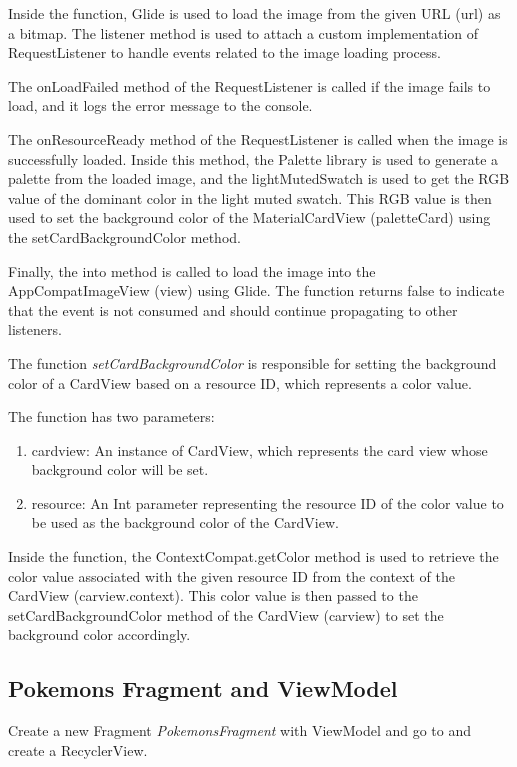 \documentclass[a4paper, 12pt]{article}
\begin{document}
Inside the function, Glide is used to load the image from the given URL (url) as a bitmap. The listener method is used to attach a custom implementation of 
RequestListener to handle events related to the image loading process.

The onLoadFailed method of the RequestListener is called if the image fails to load, and it logs the error message to the console.

The onResourceReady method of the RequestListener is called when the image is successfully loaded. Inside this method, the Palette library is used to generate a palette from the loaded image, and the lightMutedSwatch is used to get the RGB value of the dominant color in the light muted swatch. This RGB value is then used to set the background color of the MaterialCardView (paletteCard) using the setCardBackgroundColor method.

Finally, the into method is called to load the image into the AppCompatImageView (view) using Glide. The function returns false to indicate that the event is not consumed and should continue propagating to other listeners.

The function \textit{setCardBackgroundColor} is responsible for setting the background color of a CardView based on a resource ID, which represents a color value.

The function has two parameters:

\begin{enumerate}
    \item cardview: An instance of CardView, which represents the card view whose background color will be set.
    \item resource: An Int parameter representing the resource ID of the color value to be used as the background color of the CardView.
\end{enumerate}

Inside the function, the ContextCompat.getColor method is used to retrieve the color value associated with the given resource ID from the context of the CardView (carview.context).
This color value is then passed to the setCardBackgroundColor method of the CardView (carview) to set the background color accordingly.

\subsection{Pokemons Fragment and ViewModel}

Create a new Fragment \textit{PokemonsFragment} with ViewModel and go to \textit{\texttt{}} and create a RecyclerView.
\end{document}
